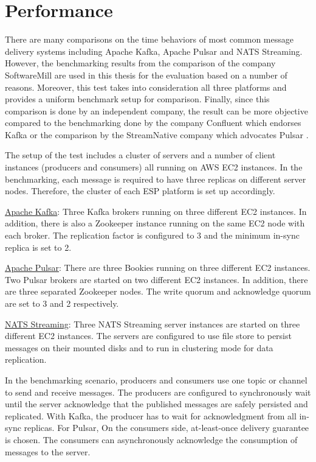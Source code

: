 \section{Performance} \label{section:performance}
There are many comparisons on the time behaviors of most common message delivery systems including Apache Kafka, Apache Pulsar and NATS Streaming. However, the benchmarking results from the comparison of the company SoftwareMill \cite{benchmarkfull} are used in this thesis for the evaluation based on a number of reasons. Moreover, this test takes into consideration all three platforms and provides a uniform benchmark setup for comparison. Finally, since this comparison is done by an independent company, the result can be more objective compared to the benchmarking done by the company Confluent which endorses Kafka \cite{benchmarkkafkapulsarrabbitmq} or the comparison by the StreamNative company which advocates Pulsar \cite{benchmarkkafkapulsar}.

The setup of the test includes a cluster of servers and a number of client instances (producers and consumers) all running on AWS EC2 instances. In the benchmarking, each message is required to have three replicas on different server nodes. Therefore, the cluster of each ESP platform is set up accordingly. 

\underline{Apache Kafka}: Three Kafka brokers running on three different EC2 instances. In addition, there is also a Zookeeper instance running on the same EC2 node with each broker. The replication factor is configured to 3 and the minimum in-sync replica is set to 2.

\underline{Apache Pulsar}: There are three Bookies running on three different EC2 instances. Two Pulsar brokers are started on two different EC2 instances. In addition, there are three separated Zookeeper nodes. The write quorum and acknowledge quorum are set to 3 and 2 respectively.

\underline{NATS Streaming}: Three NATS Streaming server instances are started on three different EC2 instances. The servers are configured to use file store to persist messages on their mounted disks and to run in clustering mode for data replication. 

In the benchmarking scenario, producers and consumers use one topic or channel to send and receive messages. The producers are configured to synchronously wait until the server acknowledge that the published messages are safely persisted and replicated. With Kafka, the producer has to wait for acknowledgment from all in-sync replicas. For Pulsar, On the consumers side, at-least-once delivery guarantee is chosen. The consumers can asynchronously acknowledge the consumption of messages to the server.

